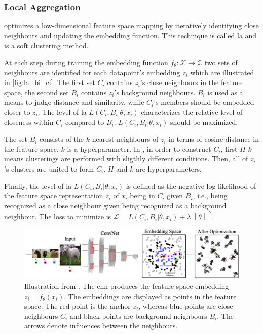 \subsubsection{Local Aggregation}\label{subsec:local_aggregation}


\citet{local_aggr_2019} optimizes a low-dimensional feature space mapping by 
iteratively identifying close neighbours and updating the embedding function.
This technique is called \ac{la} and is a soft clustering method.

At each step during training the embedding function $f_\theta: \mathcal{X} \rightarrow \mathcal{Z}$ 
two sets of neighbours are identified for each datapoint's embedding $z_i$ 
which are illustrated in \autoref{fig:la_bi_ci}.
The first set $C_i$ contains $z_i$'s close neighbours in the feature space,
the second set $B_i$ contains $z_i$'s background neighbours.
$B_i$ is used as a means to judge distance and similarity, 
while $C_i$'s members should be embedded closer to $z_i$.
The level of \ac{la} $L(C_i,B_i | \theta, x_i)$ 
characterizes the relative level of closeness within $C_i$ compared to $B_i$.
$L(C_i,B_i | \theta, x_i)$ should be maximized.

The set $B_i$ consists of the $k$ nearest neighbours of $z_i$ in terms of cosine distance 
in the feature space.
$k$ is a hyperparameter.
In \citet{local_aggr_2019}, in order to construct $C_i$, 
first $H$ $k$-means clusterings are performed with sligthly different conditions.
Then, all of $z_i$'s clusters are united to form $C_i$.
$H$ and $k$ are hyperparameters.

Finally, the level of \ac{la} $L(C_i,B_i | \theta, x_i)$ is defined as the negative log-likelihood 
of the feature space representation $z_i$ of $x_i$ being in $C_i$ given $B_i$, 
i.e., being recognized as a close neighbour given being recognized as a background neighbour.
The loss to minimize is $\mathcal{L} = L(C_i,B_i | \theta, x_i) + \lambda \left\| \theta \right\|^2$.

\begin{figure}[h] %
    \centering
    \includegraphics[width=360pt]{images/la_neighbourhoods.png}
    \caption{Illustration from \citet{local_aggr_2019}.
    The \ac{cnn} produces the feature space embedding $z_i = f_\theta(x_i)$.
    The embeddings are displayed as points in the feature space.
    The red point is the anchor $z_i$, 
    whereas blue points are close neighbours $C_i$ and
    black points are background neighbours $B_i$.
    The arrows denote influences between the neighbours.}
    \label{fig:la_bi_ci}
\end{figure}